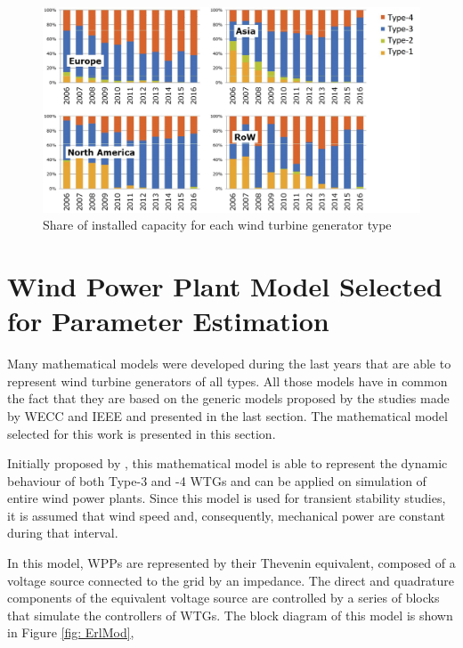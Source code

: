 \begin{figure}[h]
	\caption{Share of installed capacity for each wind turbine generator type}
	\begin{center}
		\includegraphics[scale=.2]{Images/WTGTypes.jpg}
	\end{center}
	\label{fig: WindShare}
\end{figure}

\section{Wind Power Plant Model Selected for Parameter Estimation}
\label{sec: WPP_model}

Many mathematical models were developed during the last years that are able to represent wind turbine generators of all types. All those models have in common the fact that they are based on the generic models proposed by the studies made by WECC and IEEE and presented in the last section. The mathematical model selected for this work is presented in this section.

Initially proposed by \cite{Erlich2012}, this mathematical model is able to represent the dynamic behaviour of both Type-3 and -4 WTGs and can be applied on simulation of entire wind power plants. Since this model is used for transient stability studies, it is assumed that wind speed and, consequently, mechanical power are constant during that interval.

In this model, WPPs are represented by their Thevenin equivalent, composed of a voltage source connected to the grid by an impedance. The direct and quadrature components of the equivalent voltage source are controlled by a series of blocks that simulate the controllers of WTGs. The block diagram of this model is shown in Figure \ref{fig: ErlMod},

